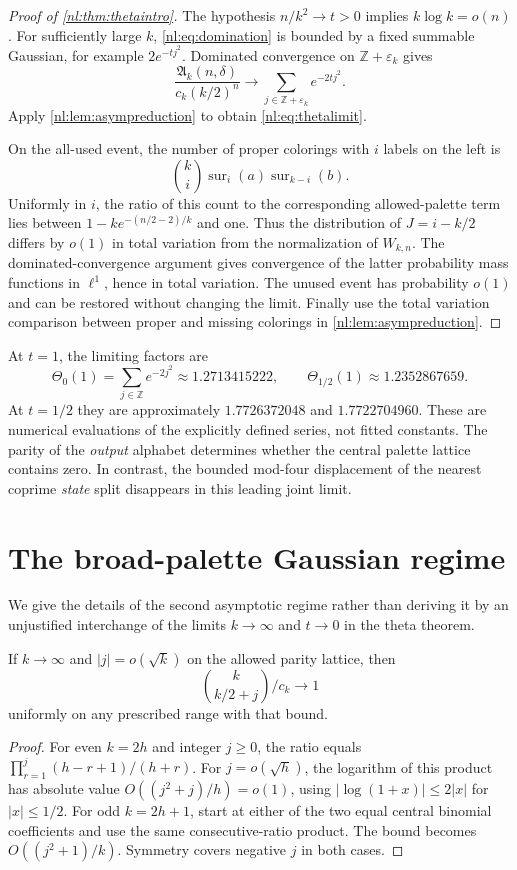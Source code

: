 \documentclass[11pt,a4paper]{article}
\numberwithin{equation}{section}
\theoremstyle{definition}
\theoremstyle{remark}
\newcommand{\Z}{\mathbb Z}
\newcommand{\sur}{\operatorname{sur}}
\newcommand{\nlenv}{\mathfrak A}
\begin{document}
\begin{proof}[Proof of \cref{nl:thm:thetaintro}]
The hypothesis $n/k^2\to t>0$ implies $k\log k=o(n)$.
For sufficiently large $k$, \eqref{nl:eq:domination} is bounded by a fixed
summable Gaussian, for example $2e^{-tj^2}$.
Dominated convergence on $\Z+\varepsilon_k$ gives
\[
 \frac{\nlenv_k(n,\delta)}{c_k(k/2)^n}
 \longrightarrow\sum_{j\in\Z+\varepsilon_k}e^{-2tj^2}.
\]
Apply \cref{nl:lem:asympreduction} to obtain \eqref{nl:eq:thetalimit}.

On the all-used event, the number of proper colorings with $i$ labels on
the left is
\[
 \binom ki\sur_i(a)\sur_{k-i}(b).
\]
Uniformly in $i$, the ratio of this count to the corresponding
allowed-palette term lies between $1-ke^{-(n/2-2)/k}$ and one.
Thus the distribution of $J=i-k/2$ differs by $o(1)$ in total variation
from the normalization of $W_{k,n}$.
The dominated-convergence argument gives convergence of the latter
probability mass functions in $\ell^1$, hence in total variation.
The unused event has probability $o(1)$ and can be restored without
changing the limit. Finally use the total variation comparison between
proper and missing colorings in \cref{nl:lem:asympreduction}.
\end{proof}

\begin{example}
At $t=1$, the limiting factors are
\[
 \Theta_0(1)=\sum_{j\in\Z}e^{-2j^2}\approx1.2713415222,
 \qquad
 \Theta_{1/2}(1)\approx1.2352867659.
\]
At $t=1/2$ they are approximately $1.7726372048$ and $1.7722704960$.
These are numerical evaluations of the explicitly defined series, not
fitted constants. The parity of the \emph{output} alphabet determines
whether the central palette lattice contains zero. In contrast, the
bounded mod-four displacement of the nearest coprime \emph{state} split
disappears in this leading joint limit.
\end{example}

\section{The broad-palette Gaussian regime}\label{nl:sec:gaussian}

We give the details of the second asymptotic regime rather than deriving
it by an unjustified interchange of the limits $k\to\infty$ and $t\to0$
in the theta theorem.

\begin{lemma}\label{nl:lem:binomial}
If $k\to\infty$ and $|j|=o(\sqrt k)$ on the allowed parity lattice, then
\[
 \binom{k}{k/2+j}/c_k\longrightarrow1
\]
uniformly on any prescribed range with that bound.
\end{lemma}
\begin{proof}
For even $k=2h$ and integer $j\ge0$, the ratio equals
$\prod_{r=1}^j(h-r+1)/(h+r)$. For $j=o(\sqrt h)$, the logarithm of this
product has absolute value $O((j^2+j)/h)=o(1)$, using
$|\log(1+x)|\le2|x|$ for $|x|\le1/2$.
For odd $k=2h+1$, start at either of the two equal central binomial
coefficients and use the same consecutive-ratio product. The bound becomes
$O((j^2+1)/k)$. Symmetry covers negative $j$ in both cases.
\end{proof}
\end{document}
